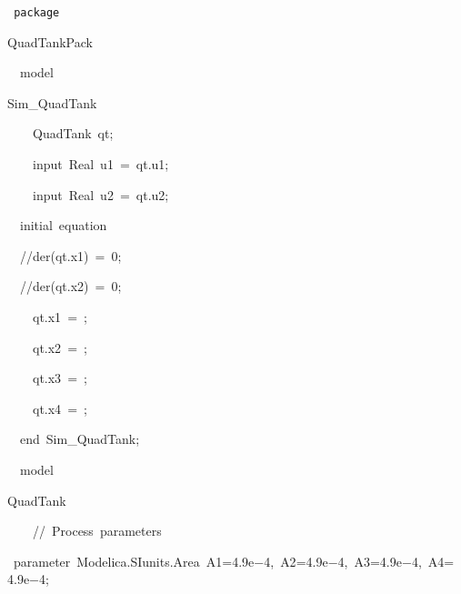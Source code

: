 


{
\tt
{\hlstd }{\hlkwa package\ }{\hlstd QuadTankPack\leavevmode\par
\leavevmode\par
}{\hlstd\ \ }{\hlstd }{\hlkwa model\ }{\hlstd Sim\_{}QuadTank\leavevmode\par
}{\hlstd\ \ \ \ }{\hlstd QuadTank\ qt}{\hlopt ;}\leavevmode\par
{\hlstd }{\hlstd\ \ \ \ }{\hlstd }{\hlkwa input\ }{\hlstd Real\ u1\ }{\hlopt $\mathord{=}$\ }{\hlstd qt.u1}{\hlopt ;}\leavevmode\par
{\hlstd }{\hlstd\ \ \ \ }{\hlstd }{\hlkwa input\ }{\hlstd Real\ u2\ }{\hlopt $\mathord{=}$\ }{\hlstd qt.u2}{\hlopt ;}\leavevmode\par
{\hlstd }{\hlstd\ \ }{\hlstd }{\hlkwb initial\ }{\hlstd }{\hlkwa equation}\leavevmode\par
{\hlstd }{\hlstd\ \ }{\hlstd }{\hlslc //der(qt.x1)\ $\mathord{=}$\ 0;}\leavevmode\par
{\hlstd }{\hlstd\ \ }{\hlstd }{\hlslc //der(qt.x2)\ $\mathord{=}$\ 0;}\leavevmode\par
{\hlstd }{\hlstd\ \ \ \ }{\hlstd qt.x1\ }{\hlopt $\mathord{=}$\ }{\hlstd }{}{\hlstd }{\hlopt ;}\leavevmode\par
{\hlstd }{\hlstd\ \ \ \ }{\hlstd qt.x2\ }{\hlopt $\mathord{=}$\ }{\hlstd }{}{\hlstd }{\hlopt ;}\leavevmode\par
{\hlstd }{\hlstd\ \ \ \ }{\hlstd qt.x3\ }{\hlopt $\mathord{=}$\ }{\hlstd }{}{\hlstd }{\hlopt ;}\leavevmode\par
{\hlstd }{\hlstd\ \ \ \ }{\hlstd qt.x4\ }{\hlopt $\mathord{=}$\ }{\hlstd }{}{\hlstd }{\hlopt ;}\leavevmode\par
{\hlstd }{\hlstd\ \ }{\hlstd }{\hlkwa end\ }{\hlstd Sim\_{}QuadTank}{\hlopt ;}\leavevmode\par
{\hlstd \leavevmode\par
}{\hlstd\ \ }{\hlstd }{\hlkwa model\ }{\hlstd QuadTank\leavevmode\par
}{\hlstd\ \ \ \ }{\hlstd }{\hlslc //\ Process\ parameters}\leavevmode\par
{\hlstd \ }{\hlkwa parameter\ }{\hlstd Modelica.SIunits.Area\ A1}{\hlopt $\mathord{=}$}{\hlstd }{\hlnum 4.9e$\mathord{-}$4}{\hlstd }{\hlopt ,\ }{\hlstd A2}{\hlopt $\mathord{=}$}{\hlstd }{\hlnum 4.9e$\mathord{-}$4}{\hlstd }{\hlopt ,\ }{\hlstd A3}{\hlopt $\mathord{=}$}{\hlstd }{\hlnum 4.9e$\mathord{-}$4}{\hlstd }{\hlopt ,\ }{\hlstd A4}{\hlopt $\mathord{=}$}{\hlstd }{\hlnum 4.9e$\mathord{-}$4}{\hlstd }{\hlopt ;}\leavevmode\par
}
